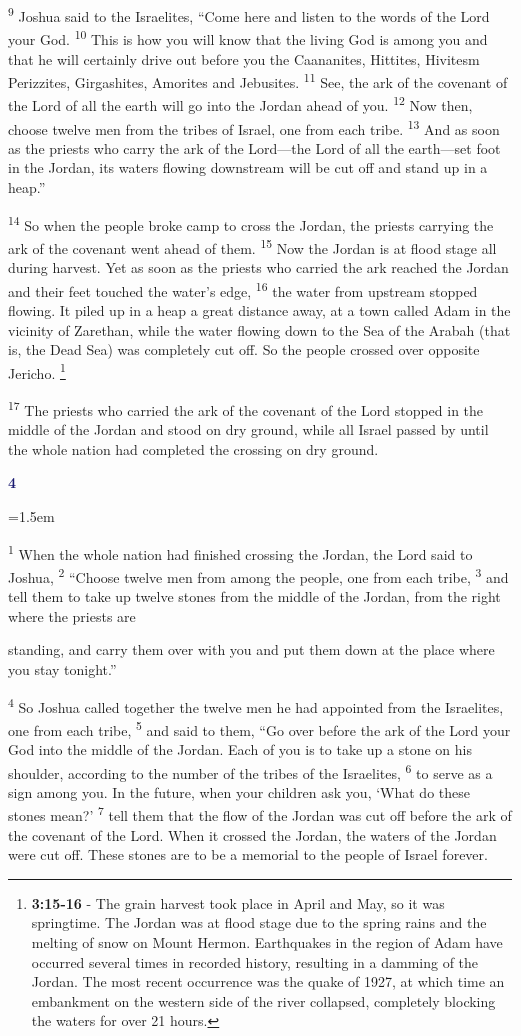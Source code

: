 \documentclass[12pt,twoside]{article}
\newcommand{\vs}[1]{\textsuperscript{#1}}
\newcommand{\vnote}[2]{%
  \begingroup
  \renewcommand\thefootnote{}%
  \footnote{\scriptsize \textbf{}#2}%
  \addtocounter{footnote}{-1}%
  \endgroup
}
\newcommand{\chapterWithIndent}[2]{%
  \noindent
  \begin{minipage}[t]{1cm}
    \vspace{-0.4\baselineskip}
    {\textcolor{MidnightBlue}{\fontsize{40pt}{48pt}\selectfont \textbf{#1}}}
  \end{minipage}%
  \hspace{0.3cm}%
  \begin{minipage}[t]{\dimexpr\linewidth - 1.5cm - 0.3cm\relax}
    \hangindent=1.5em
    \hangafter=3
    #2
    \vspace{0.05cm}
  \end{minipage}
}
\begin{document}
\vs{9} Joshua said to the Israelites, ``Come here and listen to the words of the Lord your God.
\vs{10} This is how you will know that the living God is among you and that he will certainly drive out before you the Caananites, Hittites, Hivitesm Perizzites, Girgashites, Amorites and Jebusites.
\vs{11} See, the ark of the covenant of the Lord of all the earth will go into the Jordan ahead of you.
\vs{12} Now then, choose twelve men from the tribes of Israel, one from each tribe.
\vs{13} And as soon as the priests who carry the ark of the Lord---the Lord of all the earth---set foot in the Jordan, its waters flowing downstream will be cut off and stand up in a heap.''

\vs{14} So when the people broke camp to cross the Jordan, the priests carrying the ark of the covenant went ahead of them.
\vs{15} Now the Jordan is at flood stage all during harvest. Yet as soon as the priests who carried the ark reached the Jordan and their feet touched the water's edge,
\vs{16} the water from upstream stopped flowing. It piled up in a heap a great distance away, at a town called Adam in the vicinity of Zarethan, while the water flowing down to the Sea of the Arabah (that is, the Dead Sea) was completely cut off. So the people crossed over opposite Jericho.\vnote{16}{\textbf{3:15-16} - The grain harvest took place in April and May, so it was springtime. The Jordan was at flood stage due to the spring rains and the melting of snow on Mount Hermon. Earthquakes in the region of Adam have occurred several times in recorded history, resulting in a damming of the Jordan. The most recent occurrence was the quake of 1927, at which time an
embankment on the western side of the river collapsed, completely blocking the waters for over 21 hours.}
\vs{17} The priests who carried the ark of the covenant of the Lord stopped in the middle of the Jordan and stood on dry ground, while all Israel passed by until the whole nation had completed the crossing on dry ground.

\chapterWithIndent{4}{
    \vs{1} When the whole nation had finished crossing the Jordan, the Lord said to Joshua,
    \vs{2} ``Choose twelve men from among the people, one from each tribe,
    \vs{3} and tell them to take up twelve stones from the middle of the Jordan, from the right where the priests are 
}

\noindent standing, and carry them over with you and put them down at the place where you stay tonight.''

\vs{4} So Joshua called together the twelve men he had appointed from the Israelites, one from each tribe,
\vs{5} and said to them, ``Go over before the ark of the Lord your God into the middle of the Jordan. Each of you is to take up a stone on his shoulder, according to the number of the tribes of the Israelites,
\vs{6} to serve as a sign among you. In the future, when your children ask you, `What do these stones mean?'
\vs{7} tell them that the flow of the Jordan was cut off before the ark of the covenant of the Lord. When it crossed the Jordan, the waters of the Jordan were cut off. These stones are to be a memorial to the people of Israel forever.
\end{document}
